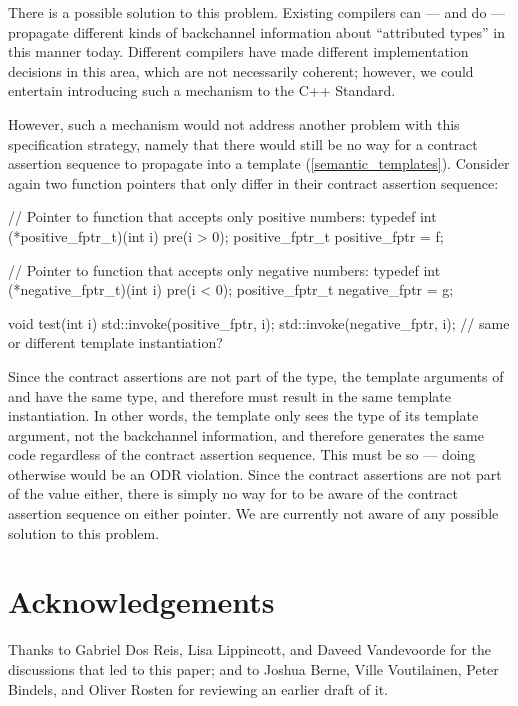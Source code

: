 There is a possible solution to this problem. Existing compilers can --- and do --- propagate different kinds of backchannel information about ``attributed types'' in this manner today. Different compilers have made different implementation decisions in this area, which are not necessarily coherent; however, we could entertain introducing such a mechanism to the C++ Standard.

However, such a mechanism would not address another problem with this specification strategy, namely that there would still be no way for a contract assertion sequence to propagate into a template (\ref{semantic_templates}). Consider again two function pointers that only differ in their contract assertion sequence:
\begin{codeblock}
// Pointer to function that accepts only positive numbers:
typedef int (*positive_fptr_t)(int i) pre(i > 0);
positive_fptr_t positive_fptr = f;

// Pointer to function that accepts only negative numbers:
typedef int (*negative_fptr_t)(int i) pre(i < 0);
positive_fptr_t negative_fptr = g;

void test(int i) {
  std::invoke(positive_fptr, i);
  std::invoke(negative_fptr, i);  // same or different template instantiation?
}
\end{codeblock}
Since the contract assertions are not part of the type, the template arguments of  and  have the same type, and therefore must result in the same template instantiation. In other words, the template only sees the type of its template argument, not the backchannel information, and therefore generates the same code regardless of the contract assertion sequence. This must be so --- doing otherwise would be an ODR violation. Since the contract assertions are not part of the value either, there is simply no way for  to be aware of the contract assertion sequence on either pointer. We are currently not aware of any possible solution to this problem.


\section*{Acknowledgements}

Thanks to Gabriel Dos Reis, Lisa Lippincott, and Daveed Vandevoorde for the discussions that led to this paper; and to Joshua Berne, Ville Voutilainen, Peter Bindels, and Oliver Rosten for reviewing an earlier draft of it.


\renewcommand{\addcontentsline}[3]{}%








